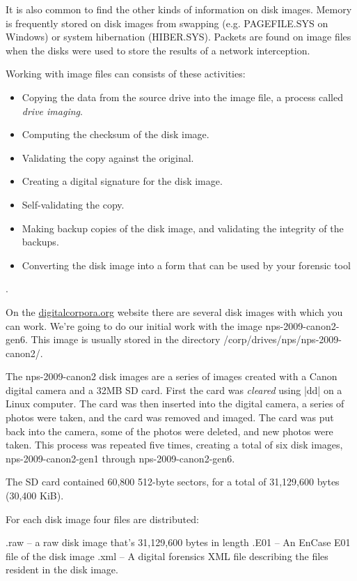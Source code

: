 It is also common to find the other kinds of information on disk
images. Memory is frequently stored on disk images from swapping
(e.g. PAGEFILE.SYS on Windows) or system hibernation
(HIBER.SYS). Packets are found on image files when the disks were used
to store the results of a network interception.

Working with image files can consists of these activities:


\begin{itemize}
\item Copying the data from the source drive into the image file, a
  process called \emph{drive imaging}.
\item Computing the checksum of the disk image.
\item Validating the copy against the original.
\item Creating a digital signature for the disk image.
\item Self-validating the copy.
\item Making backup copies of the disk image, and validating the integrity
  of the backups.
\item Converting the disk image into a form that can be used by your
  forensic tool
\end{itemize}.

On the \url{digitalcorpora.org} website there are several disk images with
which you can work. We're going to do our initial work with the image
nps-2009-canon2-gen6. This image is usually stored in the directory
/corp/drives/nps/nps-2009-canon2/.

The nps-2009-canon2 disk images are a series of images created with a
Canon digital camera and a 32MB SD card. First the card was
\emph{cleared} using |dd| on a Linux computer. The card was then
inserted into the digital camera, a series of photos were taken, and
the card was removed and imaged. The card was put back into the
camera, some of the photos were deleted, and new photos were
taken. This process was repeated five times, creating a total of six
disk images, nps-2009-canon2-gen1 through nps-2009-canon2-gen6.

The SD card contained 60,800 512-byte sectors, for a total of
31,129,600 bytes (30,400 KiB).

For each disk image four files are distributed:

   .raw -- a raw disk image that's 31,129,600 bytes in length
   .E01 -- An EnCase E01 file of the disk image
   .xml -- A digital forensics XML file describing the files resident
           in the disk image.


